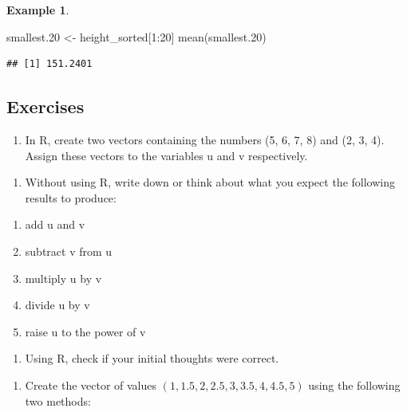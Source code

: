 \documentclass[
]{book}
\newenvironment{Shaded}{\begin{snugshade}}{\end{snugshade}}
\newcommand{\DecValTok}[1]{\textcolor[rgb]{0.00,0.00,0.81}{#1}}
\newcommand{\FloatTok}[1]{\textcolor[rgb]{0.00,0.00,0.81}{#1}}
\newcommand{\FunctionTok}[1]{\textcolor[rgb]{0.00,0.00,0.00}{#1}}
\newcommand{\NormalTok}[1]{#1}
\newcommand{\OtherTok}[1]{\textcolor[rgb]{0.56,0.35,0.01}{#1}}
\newcommand{\SpecialCharTok}[1]{\textcolor[rgb]{0.00,0.00,0.00}{#1}}
\providecommand{\tightlist}{%
  \setlength{\itemsep}{0pt}\setlength{\parskip}{0pt}}
\theoremstyle{definition}
\theoremstyle{definition}
\newtheorem{example}{Example}[chapter]
\theoremstyle{definition}
\theoremstyle{definition}
\theoremstyle{remark}
\begin{document}
\begin{example}
\begin{Shaded}
\begin{Highlighting}[]
\NormalTok{smallest}\FloatTok{.20} \OtherTok{\textless{}{-}}\NormalTok{ height\_sorted[}\DecValTok{1}\SpecialCharTok{:}\DecValTok{20}\NormalTok{]}
\FunctionTok{mean}\NormalTok{(smallest}\FloatTok{.20}\NormalTok{)}
\end{Highlighting}
\end{Shaded}

\begin{verbatim}
## [1] 151.2401
\end{verbatim}

\end{example}

\hypertarget{exercises}{%
\subsection{Exercises}\label{exercises}}

\begin{enumerate}
\def\labelenumi{\arabic{enumi}.}
\tightlist
\item
  In R, create two vectors containing the numbers (5, 6, 7, 8) and (2, 3, 4). Assign these vectors to the variables u and v respectively.
\end{enumerate}

\begin{enumerate}
\def\labelenumi{\roman{enumi}.}
\tightlist
\item
  Without using R, write down or think about what you expect the following results to produce:
\end{enumerate}

\begin{enumerate}
\def\labelenumi{\alph{enumi}.}
\tightlist
\item
  add u and v
\item
  subtract v from u
\item
  multiply u by v
\item
  divide u by v
\item
  raise u to the power of v
\end{enumerate}

\begin{enumerate}
\def\labelenumi{\roman{enumi}.}
\setcounter{enumi}{1}
\tightlist
\item
  Using R, check if your initial thoughts were correct.
\end{enumerate}

\begin{enumerate}
\def\labelenumi{\arabic{enumi}.}
\setcounter{enumi}{1}
\tightlist
\item
  Create the vector of values \((1, 1.5, 2, 2.5, 3, 3.5, 4, 4.5, 5)\) using the following two methods:
\end{enumerate}
\end{document}
